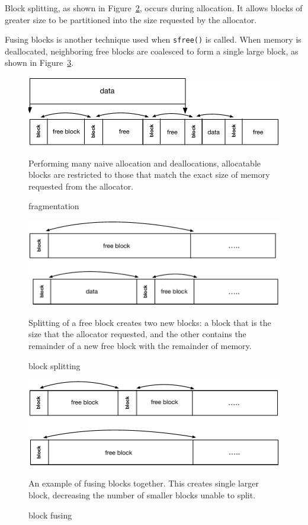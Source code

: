 Block splitting, as shown in Figure~\ref{fig:split}, occurs during allocation. It allows blocks of greater size to be partitioned into the size requested by the allocator. 

Fusing blocks is another technique used when \texttt{sfree()} is called. When memory is deallocated, neighboring free blocks are coalesced to form a single large block, as shown in Figure~\ref{fig:fuse}. 

\begin{figure}[!htb]
\includegraphics[scale=.55]{figs/fragmentation.pdf}
\caption{fragmentation}
\label{fig:fragmentation}
Performing many naive allocation and deallocations, allocatable blocks are restricted to those that match the exact size of memory requested from the allocator.
\end{figure}

\begin{figure}[!htb]
\includegraphics[scale=.55]{figs/split.pdf}
\caption{block splitting}
Splitting of a free block creates two new blocks: a block that is the size that the allocator requested, and the other contains the remainder of a new free block with the remainder of memory.
\label{fig:split}
\end{figure}


\begin{figure}[!htb]
\includegraphics[scale=.55]{figs/fuse.pdf}
\caption{block fusing}
An example of fusing blocks together. This creates single larger block, decreasing the number of smaller blocks unable to split.
\label{fig:fuse}
\end{figure}

%
%